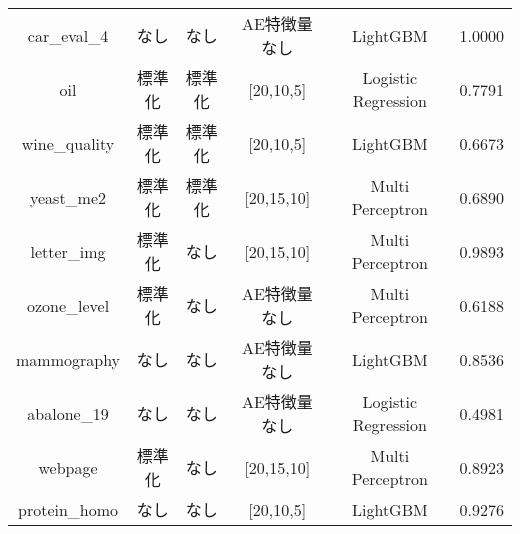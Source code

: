 \begin{table}[htbp]
\begin{tabular}{cccccc}
        car\_eval\_4 & なし & なし & AE特徴量なし & LightGBM & 1.0000\\
        oil & 標準化 & 標準化 & [20,10,5] & Logistic Regression & 0.7791\\
        wine\_quality & 標準化 & 標準化 & [20,10,5] & LightGBM & 0.6673\\
        yeast\_me2 & 標準化 & 標準化 & [20,15,10] & Multi Perceptron & 0.6890\\
        letter\_img & 標準化 & なし & [20,15,10] & Multi Perceptron & 0.9893\\
        ozone\_level & 標準化 & なし & AE特徴量なし & Multi Perceptron & 0.6188\\
        mammography & なし & なし & AE特徴量なし & LightGBM & 0.8536\\
        abalone\_19 & なし & なし & AE特徴量なし & Logistic Regression & 0.4981\\
        webpage & 標準化 & なし & [20,15,10] & Multi Perceptron & 0.8923\\
        protein\_homo & なし & なし & [20,10,5] & LightGBM & 0.9276\\
        \hline

    \end{tabular}
\end{table}